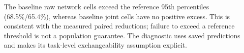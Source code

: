 The baseline raw network cells exceed the reference 95th percentiles (68.5\%/65.4\%), whereas baseline joint cells have no positive excess. This is consistent with the measured paired reductions; failure to exceed a reference threshold is not a population guarantee. The diagnostic uses saved predictions and makes its task-level exchangeability assumption explicit.
